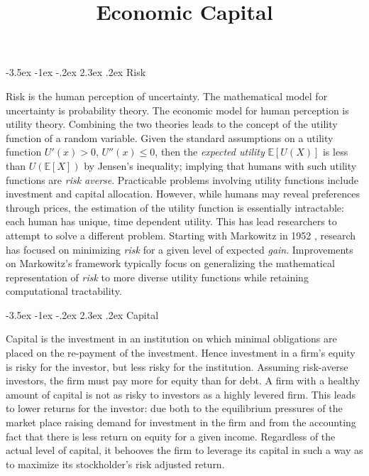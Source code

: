 \documentclass[12pt]{article}
\title{Economic Capital}
\makeatletter
\theoremstyle{definition}
\renewcommand\section{\@startsection{section}{1}{\z@}%
                                  {-3.5ex \@plus -1ex \@minus -.2ex}%
                                  {2.3ex \@plus.2ex}%
                                  {\normalfont\large\bfseries}}
\makeatother
\begin{document}

\setlength{\parindent}{0pt}













\maketitle


\section{Risk}

Risk is the human perception of uncertainty.  The mathematical model for uncertainty is probability theory. The economic model for human perception is utility theory.  Combining the two theories leads to the concept of the utility function of a random variable.  Given the standard assumptions on a utility function \(U'(x)>0,\,U''(x)\leq 0\), then the \emph{expected utility} \(\mathbb{E}[U(X)]\) is less than \(U(\mathbb{E}[X])\) by Jensen's inequality; implying that humans with such utility functions are \emph{risk averse}.  Practicable problems involving utility functions include investment and capital allocation.  However, while humans may reveal preferences through prices, the estimation of the utility function is essentially intractable: each human has unique, time dependent utility.  This has lead researchers to attempt to solve a different problem.  Starting with Markowitz in 1952 \cite{markowitz1952}, research has focused on minimizing \emph{risk} for a given level of expected \emph{gain}.  Improvements on Markowitz's framework typically focus on generalizing the mathematical representation of \emph{risk} to more diverse utility functions while retaining computational tractability.

\section{Capital}

Capital is the investment in an institution on which minimal obligations are placed on the re-payment of the investment.  Hence investment in a firm's equity is risky for the investor, but less risky for the institution.  Assuming risk-averse investors, the firm must pay more for equity than for debt.  A firm with a healthy amount of capital is not as risky to investors as a highly levered firm.  This leads to lower returns for the investor: due both to the equilibrium pressures of the market place raising demand for investment in the firm and from the accounting fact that there is less return on equity for a given income. Regardless of the actual level of capital, it behooves the firm to leverage its capital in such a way as to maximize its stockholder's risk adjusted return.  
\end{document}
